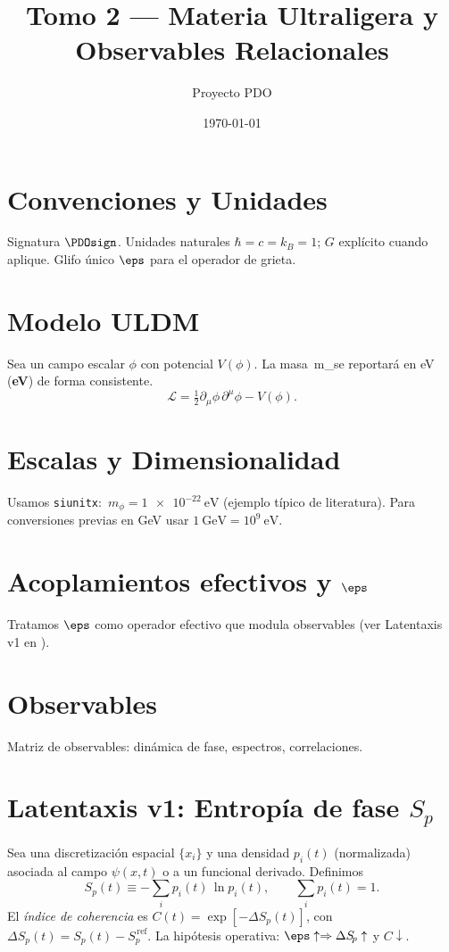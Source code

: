 \documentclass[11pt]{article}
\title{Tomo 2 — Materia Ultraligera y Observables Relacionales}
\author{Proyecto PDO}
\date{\today}
\begin{document}
\maketitle
\tableofcontents

\section{Convenciones y Unidades}
Signatura \(\PDOsign\). Unidades naturales \(\hbar=c=k_B=1\); \(G\) explícito cuando aplique.
Glifo único \(\eps\) para el operador de grieta.

\section{Modelo ULDM}
Sea un campo escalar \(\phi\) con potencial \(V(\phi)\).
La masa \,m_\phi se reportará en \si{\electronvolt} (\textbf{eV}) de forma consistente.
\begin{equation}
\mathcal{L} = \tfrac{1}{2}\partial_\mu\phi\,\partial^\mu\phi - V(\phi).
\label{eq:uldm-lagrangian}
\end{equation}

\section{Escalas y Dimensionalidad}
Usamos \texttt{siunitx}:
\(\,m_\phi = \SI{1e-22}{\electronvolt}\) (ejemplo típico de literatura).
Para conversiones previas en \si{\giga\electronvolt} usar \(1~\si{\giga\electronvolt}=10^9~\si{\electronvolt}\).

\section{Acoplamientos efectivos y \texorpdfstring{\(\eps\)}{epsilon}}
Tratamos \(\eps\) como operador efectivo que modula observables (ver Latentaxis v1 en ).

\section{Observables}\label{sec:obs}
Matriz de observables: dinámica de fase, espectros, correlaciones.

\section{Latentaxis v1: Entropía de fase \texorpdfstring{\(S_{\!p}\)}{Sp}}
\label{sec:latentaxis}
Sea una discretización espacial \(\{x_i\}\) y una densidad \(p_i(t)\) (normalizada)
asociada al campo \(\psi(x,t)\) o a un funcional derivado. Definimos
\begin{equation}
S_{\!p}(t) \equiv -\sum_i p_i(t)\,\ln p_i(t), \qquad \sum_i p_i(t)=1.
\label{eq:latentaxis-entropy}
\end{equation}
El \textit{índice de coherencia} es \(C(t)=\exp[-\Delta S_{\!p}(t)]\),
con \(\Delta S_{\!p}(t)=S_{\!p}(t)-S_{\!p}^{\,\mathrm{ref}}\).
La hipótesis operativa: \(\eps \uparrow \Rightarrow \Delta S_{\!p}\uparrow\) y \(C\downarrow\).

\printbibliography
\end{document}
